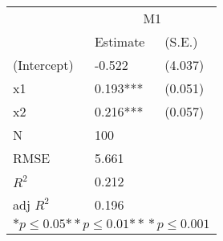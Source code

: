 \begin{tabular}{*{3}{l}}
\hline
                  & \multicolumn{2}{c}{M1}   \tabularnewline
                   &Estimate  &(S.E.)  \tabularnewline
 \hline
 \hline
   (Intercept)     &-0.522   &   (4.037) \tabularnewline
   x1              &0.193***   &   (0.051) \tabularnewline
   x2              &0.216***   &   (0.057) \tabularnewline
 \hline
 N                 &100       &        \tabularnewline
 RMSE             &5.661         & \tabularnewline
 $R^2$             &0.212         & \tabularnewline
 adj $R^2$         &0.196         & \tabularnewline
 \hline
\hline
 
 \multicolumn{3}{c}{${*  p}\le 0.05$${*\!\!*  p}\le 0.01$${*\!\!*\!\!*  p}\le 0.001$}\tabularnewline
 \end{tabular}